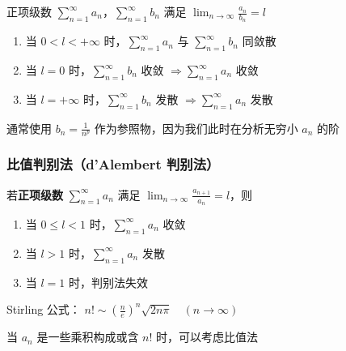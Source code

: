 \documentclass[lang = zh , final , oneside , openany , titlepage , zihao = -4 , linespread = 1.3 , baselineskip = false , cjk-font = windows , text-font = newtx , math-font = newtx , math-style = TeX]{sjtureport}
\begin{document}
\begin{theorem}
    正项级数
\(\displaystyle \sum_{n=1}^\infty a_n\)，\(\displaystyle \sum_{n=1}^\infty b_n\)
满足 \(\displaystyle \lim_{n\to\infty} \frac{a_n}{b_n} = l\)

\begin{enumerate}
\item
  当 \(0 <l<+\infty\) 时，\(\displaystyle \sum_{n=1}^\infty a_n\) 与
  \(\displaystyle \sum_{n=1}^\infty b_n\) 同敛散
\item
  当 \(l=0\) 时，\(\displaystyle \sum_{n=1}^\infty b_n\) 收敛
  \(\Rightarrow \displaystyle \sum_{n=1}^\infty a_n\) 收敛
\item
  当 \(l=+\infty\) 时，\(\displaystyle \sum_{n=1}^\infty b_n\) 发散
  \(\Rightarrow \displaystyle \sum_{n=1}^\infty a_n\) 发散
\end{enumerate}
\end{theorem}

\begin{remark}
    通常使用 \(b_n = \frac{1}{n^p}\) 作为参照物，因为我们此时在分析无穷小
\(a_n\) 的阶
\end{remark}

\subsubsection{比值判别法（d'Alembert 判别法）}

\begin{theorem}
    若\textbf{正项级数} \(\displaystyle \sum_{n=1}^\infty a_n\) 满足
\(\displaystyle \lim_{n\to\infty} \frac{a_{n+1}}{a_n} = l\)，则

\begin{enumerate}
\item
  当 \(0\leq l<1\) 时，\(\displaystyle \sum_{n=1}^\infty a_n\) 收敛
\item
  当 \(l>1\) 时，\(\displaystyle \sum_{n=1}^\infty a_n\) 发散
\item
  当 \(l=1\) 时，判别法失效
\end{enumerate}
\end{theorem}

\begin{remark}
    Stirling 公式：
\(n! \sim \left(\frac{n}{e}\right)^n \sqrt{2n\pi} \quad (n\to\infty)\)
\end{remark}

\begin{remark}
    当 \(a_n\) 是一些乘积构成或含 \(n!\) 时，可以考虑比值法
\end{remark}
\end{document}
